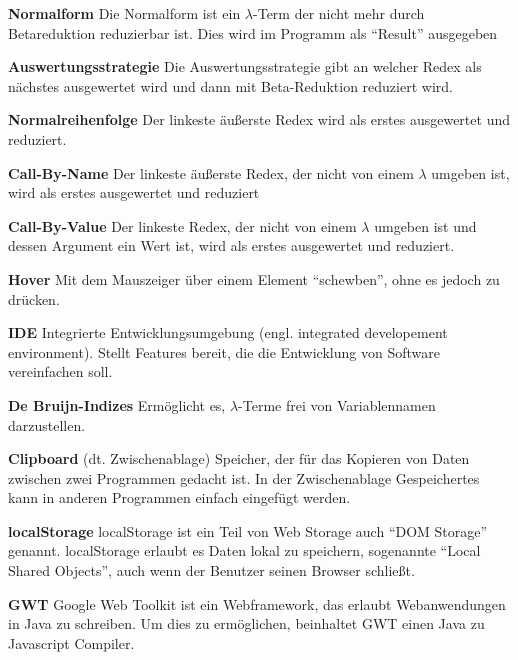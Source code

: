 \documentclass[parskip=full,11pt,twoside]{scrartcl}
\begin{document}
\textbf{Normalform}
\newline
Die Normalform ist ein $\lambda$-Term der nicht mehr durch Betareduktion reduzierbar ist. Dies wird im Programm als \enquote{Result} ausgegeben

\textbf{Auswertungsstrategie}
\newline
Die Auswertungsstrategie gibt an welcher Redex als nächstes ausgewertet wird und dann mit Beta-Reduktion reduziert wird.

\textbf{Normalreihenfolge}
\newline
Der linkeste äußerste Redex wird als erstes ausgewertet und reduziert.

\textbf{Call-By-Name}
\newline
Der linkeste äußerste Redex, der nicht von einem $\lambda$ umgeben ist, wird als erstes ausgewertet und reduziert

\textbf{Call-By-Value}
\newline
Der linkeste Redex, der nicht von einem $\lambda$ umgeben ist und dessen Argument ein Wert ist, wird als erstes ausgewertet und reduziert.

\textbf{Hover}
\newline
Mit dem Mauszeiger über einem Element \enquote{schewben}, ohne es jedoch zu drücken.

\textbf{IDE}
\newline
Integrierte Entwicklungsumgebung (engl. integrated developement environment). Stellt Features bereit, die die Entwicklung von Software vereinfachen soll.

\textbf{De Bruijn-Indizes}
\newline
Ermöglicht es, $\lambda$-Terme frei von Variablennamen darzustellen.

\textbf{Clipboard}
\newline
(dt. Zwischenablage) Speicher, der für das Kopieren von Daten zwischen zwei Programmen gedacht ist. In der Zwischenablage Gespeichertes kann in anderen Programmen einfach eingefügt werden.

\textbf{localStorage}
\newline
localStorage ist ein Teil von Web Storage auch \enquote{DOM Storage} genannt. localStorage erlaubt es Daten lokal zu speichern, sogenannte \enquote{Local Shared Objects}, auch wenn der Benutzer seinen Browser schließt.

\textbf{GWT}
\newline
Google Web Toolkit ist ein Webframework, das erlaubt Webanwendungen in Java zu schreiben. Um dies zu ermöglichen, beinhaltet GWT einen Java zu Javascript Compiler.
\end{document}
